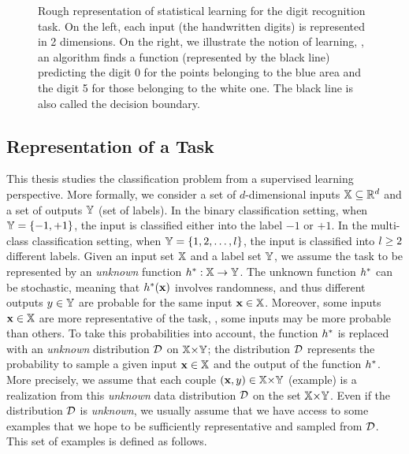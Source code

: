 \begin{figure}[H]
    \centering
    
    \caption[Representration of Statistical Learning]{
    Rough representation of statistical learning for the digit recognition task. 
    On the left, each input (the handwritten digits) is represented in 2 dimensions.
    On the right, we illustrate the notion of learning, \ie, an algorithm finds a function (represented by the black line) predicting the digit 0 for the points belonging to the blue area and the digit 5 for those belonging to the white one.
    The black line is also called the decision boundary.
    }
    \label{chap:intro:fig:intro}
\end{figure}

\subsection{Representation of a Task}

This thesis studies the classification problem from a supervised learning perspective.
More formally, we consider a set of $d$-dimensional inputs $\mathbb{X}\subseteq \mathbb{R}^d$ and a set of outputs $\mathbb{Y}$ (\aka set of labels).
In the binary classification setting, when $\mathbb{Y}=\{-1, +1\}$, the input is classified either into the label $-1$ or $+1$.
In the multi-class classification setting, when $\mathbb{Y}=\{1, 2, \dots, l\}$, the input is classified into $l\ge 2$ different labels.
Given an input set $\mathbb{X}$ and a label set $\mathbb{Y}$, we assume the task to be represented by an {\it unknown} function $h^*: \mathbb{X}\to\mathbb{Y}$.
The unknown function $h^*$ can be stochastic, meaning that $h^*(\mathbf{x})$ involves randomness, and thus different outputs $y\in\mathbb{Y}$ are probable for the same input $\mathbf{x}\in\mathbb{X}$.
Moreover, some inputs $\mathbf{x}\in\mathbb{X}$ are more representative of the task, \ie, some inputs may be more probable than others.
To take this probabilities into account, the function $h^*$ is replaced with an {\it unknown} distribution $\mathcal{D}$ on $\mathbb{X}{\times}\mathbb{Y}$; the distribution $\mathcal{D}$ represents the probability to sample a given input $\mathbf{x}\in\mathbb{X}$ and the output of the function $h^*$.
More precisely, we assume that each couple $(\mathbf{x}, y)\in \mathbb{X}{\times}\mathbb{Y}$ (\aka example) is a realization from this {\it unknown} data distribution $\mathcal{D}$ on the set $\mathbb{X}{\times}\mathbb{Y}$.
Even if the distribution $\mathcal{D}$ is {\it unknown}, we usually assume that we have access to some examples that we hope to be sufficiently representative and sampled from $\mathcal{D}$.
This set of examples is defined as follows.

